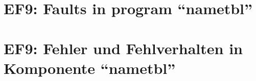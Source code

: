 
\thispagestyle{empty}
\ifenglish
\section*{EF9: Faults in program ``nametbl''}

\fi
\ifgerman
\section*{EF9: Fehler und Fehlverhalten in Komponente "`nametbl"'}

\fi

